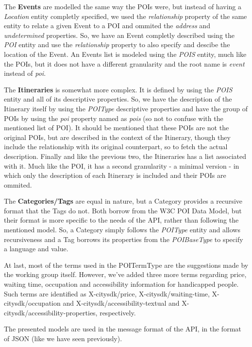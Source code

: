\documentclass[times]{ettauth}
\begin{document}
The \textbf{Events} are modelled the same way the \acp{POI} were, but instead of having a \textit{Location} entity completly specified, we used the \textit{relationship} property of the same entity to relate a given Event to a \ac{POI} and ommited the \textit{address} and \textit{undetermined} properties. So, we have an Event completly described using the \textit{POI} entity and use the \textit{relationship} property to also specify and descibe the location of the Event. An Events list is modeled using the \textit{POIS} entity, much like the \acp{POI}, but it does not have a different granularity and the root name is \textit{event} instead of \textit{poi}.

The \textbf{Itineraries} is somewhat more complex. It is defined by using the \textit{POIS} entity and all of its descriptive properties. So, we have the description of the Itinerary itself by using the \textit{POIType} descriptive properties and have the group of \acp{POI} by using the \textit{poi} property named as \textit{pois} (so not to confuse with the mentioned list of \ac{POI}). It should be mentioned that these \acp{POI} are not the original \acp{POI}, but are described in the context of the Itinerary, though they include the relationship with its original counterpart, so to fetch the actual description. Finally and like the previous two, the Itineraries has a list associated with it. Much like the \ac{POI}, it has a second granularity - a minimal version - in which only the description of each Itinerary is included and their \acp{POI} are ommited.

The \textbf{Categories/Tags} are equal in nature, but a Category provides a recursive format that the Tags do not. Both borrow from the W3C POI Data Model, but their format is more specific to the needs of the API, rather than following the mentioned model. So, a Category simply follows the \textit{POIType} entity and allows recursiveness and a Tag borrows its properties from the \textit{POIBaseType} to specify a language and value.

At last, most of the terms used in the POITermType are the suggestions made by the working group itself. However, we've added three more terms regarding price, waiting time, occupation and accessibility information for handicapped people. Such terms are identified as X-citysdk/price, X-citysdk/waiting-time, X-citysdk/occupation and X-citysdk/accessibility-textual and X-citysdk/accessibility-properties, respectively.

The presented models are used in the message format of the API, in the format of \ac{JSON} (like we have seen previously).
\end{document}
